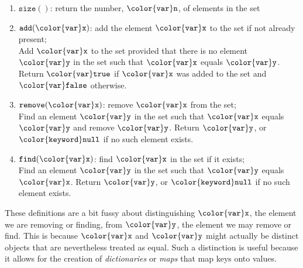 \documentclass[10pt]{book}
\theoremstyle{plain}
\theoremstyle{definition}
\begin{document}
\begin{enumerate}
  \item \ensuremath{\mathtt{size()}}: return the number, \ensuremath{\mathtt{{\color{var}n}}}, of elements in the set
  \item \ensuremath{\mathtt{add({\color{var}x})}}: add the element \ensuremath{\mathtt{{\color{var}x}}} to the set if not already present; \\
    Add \ensuremath{\mathtt{{\color{var}x}}} to the set provided that there
    is no element \ensuremath{\mathtt{{\color{var}y}}} in the set such that \ensuremath{\mathtt{{\color{var}x}}} equals \ensuremath{\mathtt{{\color{var}y}}}.  Return \ensuremath{\mathtt{{\color{var}true}}}
    if \ensuremath{\mathtt{{\color{var}x}}} was added to the set and \ensuremath{\mathtt{{\color{var}false}}} otherwise.
  \item \ensuremath{\mathtt{remove({\color{var}x})}}: remove \ensuremath{\mathtt{{\color{var}x}}} from the set; \\
    Find an element \ensuremath{\mathtt{{\color{var}y}}} in the set such that \ensuremath{\mathtt{{\color{var}x}}} equals
    \ensuremath{\mathtt{{\color{var}y}}} and remove \ensuremath{\mathtt{{\color{var}y}}}.  Return \ensuremath{\mathtt{{\color{var}y}}}, or \ensuremath{\mathtt{{\color{keyword}null}}} if no such element exists.
  \item \ensuremath{\mathtt{find({\color{var}x})}}: find \ensuremath{\mathtt{{\color{var}x}}} in the set if it exists; \\
    Find an element \ensuremath{\mathtt{{\color{var}y}}} in the set such that \ensuremath{\mathtt{{\color{var}y}}} equals
    \ensuremath{\mathtt{{\color{var}x}}}.  Return \ensuremath{\mathtt{{\color{var}y}}}, or \ensuremath{\mathtt{{\color{keyword}null}}} if no such element exists.
\end{enumerate}

These definitions are a bit fussy about distinguishing \ensuremath{\mathtt{{\color{var}x}}}, the element
we are removing or finding, from \ensuremath{\mathtt{{\color{var}y}}}, the element we may remove or find.
This is because \ensuremath{\mathtt{{\color{var}x}}} and \ensuremath{\mathtt{{\color{var}y}}} might actually be distinct objects that
are nevertheless treated as equal.
Such a distinction is  useful because it allows for the creation of
\emph{dictionaries} or \emph{maps} that map keys onto values.
%
%
\end{document}
